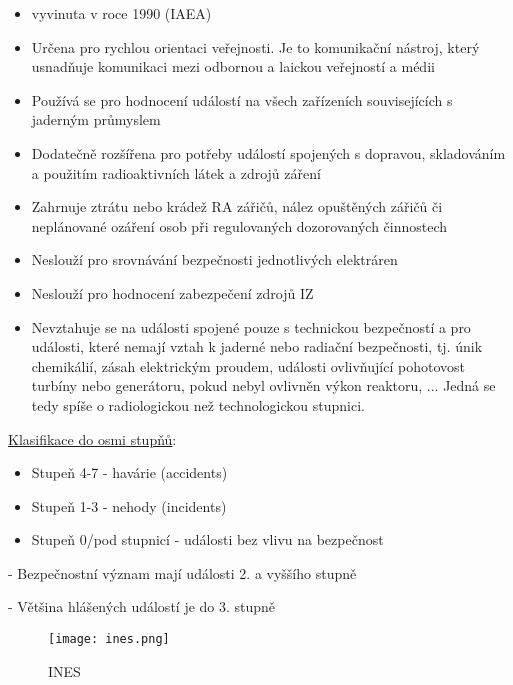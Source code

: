 \begin{itemize}
    \item vyvinuta v roce 1990 (IAEA)
    \item Určena pro rychlou orientaci veřejnosti. Je to komunikační nástroj, který usnadňuje komunikaci mezi odbornou a laickou veřejností a médii
    \item Používá se pro hodnocení událostí na všech zařízeních souvisejících s jaderným průmyslem
    \item Dodatečně rozšířena pro potřeby událostí spojených s dopravou, skladováním a použitím radioaktivních látek a zdrojů záření
    \item Zahrnuje ztrátu nebo krádež RA zářičů, nález opuštěných zářičů či neplánované ozáření osob při regulovaných dozorovaných činnostech
    \item Neslouží pro srovnávání bezpečnosti jednotlivých elektráren
    \item Neslouží pro hodnocení zabezpečení zdrojů IZ
    \item Nevztahuje se na události spojené pouze s technickou bezpečností a pro události, které nemají vztah k jaderné nebo radiační bezpečnosti, tj. únik chemikálií, zásah elektrickým proudem, události ovlivňující pohotovost turbíny nebo generátoru, pokud nebyl ovlivněn výkon reaktoru, ... Jedná se tedy spíše o radiologickou než technologickou stupnici.
\end{itemize}


\underline{Klasifikace do osmi stupňů}:
\begin{itemize}
	\item Stupeň 4-7 - havárie (accidents)
	\item Stupeň 1-3 - nehody (incidents)
	\item Stupeň 0/pod stupnicí - události bez vlivu na bezpečnost
\end{itemize}
	
\noindent - 	Bezpečnostní význam mají události 2. a vyššího stupně

\noindent - 	Většina hlášených událostí je do 3. stupně

\begin{figure}[ht!]
	\centering
	\texttt{[image: ines.png]}
	\caption{INES}
	\label{fig:ines} 
\end{figure}

